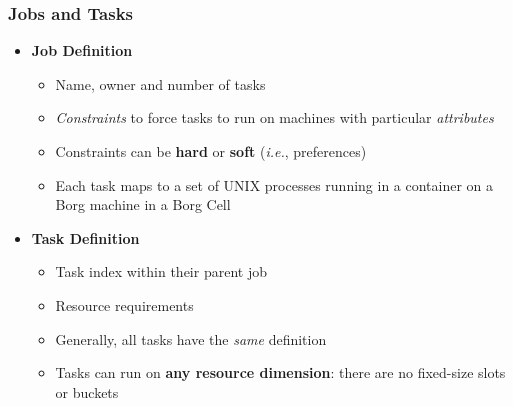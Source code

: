 \begin{frame}
\frametitle{Jobs and Tasks}
\begin{itemize}
	\item {\bf Job Definition}
	\begin{itemize}
		\item Name, owner and number of tasks
		\item {\it Constraints} to force tasks to run on machines with particular {\it attributes}
		\item Constraints can be {\bf hard} or {\bf soft} ({\it i.e.}, preferences)
		\item Each task maps to a set of UNIX processes running in a container on a Borg machine in a Borg Cell
	\end{itemize}

\vspace{20pt}

	\item {\bf Task Definition}
	\begin{itemize}
		\item Task index within their parent job
		\item Resource requirements
		\item Generally, all tasks have the {\it same} definition
		\item Tasks can run on {\bf any resource dimension}: there are no fixed-size slots or buckets
	\end{itemize}
\end{itemize}
\end{frame}

